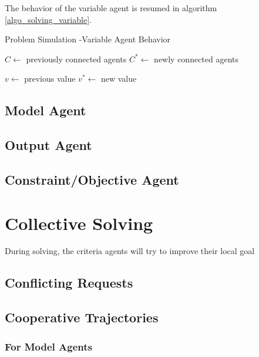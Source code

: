 The behavior of the variable agent is resumed in algorithm \ref{algo_solving_variable}.

\begin{algorithm}
\caption{Problem Simulation -Variable Agent Behavior}
\label{algo_solving_variable}
\begin{algorithmic}
	$C \leftarrow$ previously connected agents\;
	$C^* \leftarrow$  newly connected agents\;
		
	$v \leftarrow$ previous value\;
	$v^* \leftarrow$ new value\;
	
	
\end{algorithmic}
\end{algorithm}



\subsection{Model Agent}

\subsection{Output Agent}

\subsection{Constraint/Objective Agent}

\section{Collective Solving}\label{collective_solv}

During solving, the criteria agents will try to improve their local goal 

\subsection{Conflicting Requests}

\subsection{Cooperative Trajectories}

\subsubsection{For Model Agents}

